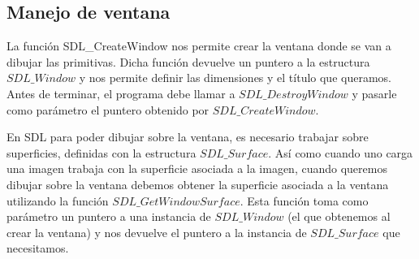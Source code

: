 \documentclass[a4paper]{article}
\begin{document}
\subsection{Manejo de ventana}
La función SDL_CreateWindow nos permite crear la ventana donde se van a dibujar las primitivas. Dicha función devuelve un puntero a la estructura $SDL\_Window$ y nos permite definir las dimensiones y el título que queramos. Antes de terminar, el programa debe llamar a $SDL\_DestroyWindow$ y pasarle como parámetro el puntero obtenido por $SDL\_CreateWindow$.
\par En SDL para poder dibujar sobre la ventana, es necesario trabajar sobre superficies, definidas con la estructura $SDL\_Surface$. Así como cuando uno carga una imagen trabaja con la superficie asociada a la imagen, cuando queremos dibujar sobre la ventana debemos obtener la superficie asociada a la ventana utilizando la función $SDL\_GetWindowSurface$. Esta función toma como parámetro un puntero a una instancia de $SDL\_Window$ (el que obtenemos al crear la ventana) y nos devuelve el puntero a la instancia de $SDL\_Surface$ que necesitamos.
\end{document}
